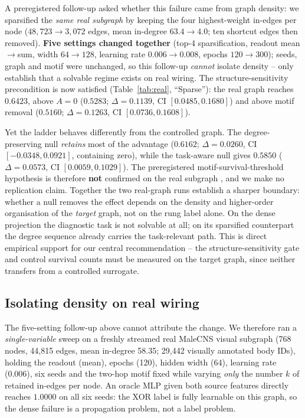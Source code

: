 \documentclass[10pt,twocolumn,letterpaper]{article}
\begin{document}
A preregistered follow-up asked whether this failure came from graph density:
we sparsified the \emph{same real subgraph} by keeping the four
highest-weight in-edges per node ($48{,}723 \to 3{,}072$ edges, mean in-degree
$63.4 \to 4.0$; ten shortcut edges then removed). \textbf{Five settings
changed together} (top-4 sparsification, readout mean$\to$sum, width
$64\!\to\!128$, learning rate $0.006\!\to\!0.008$, epochs $120\!\to\!300$);
seeds, graph and motif were unchanged, so this follow-up \emph{cannot} isolate
density -- only establish that a solvable regime exists on real wiring. The
structure-sensitivity precondition is now satisfied (Table~\ref{tab:real},
``Sparse''): the real graph reaches $0.6423$, above $A\!=\!0$ ($0.5283$;
$\Delta=0.1139$, CI $[0.0485,0.1680]$) and above motif removal ($0.5160$;
$\Delta=0.1263$, CI $[0.0736,0.1608]$).

Yet the ladder behaves differently from the controlled graph. The
degree-preserving null \emph{retains} most of the advantage ($0.6162$;
$\Delta=0.0260$, CI $[-0.0348,0.0921]$, containing zero), while the
task-aware null gives $0.5850$ ($\Delta=0.0573$, CI
$[0.0059,0.1029]$). The preregistered motif-survival-threshold hypothesis is
therefore \textbf{not} confirmed on the real subgraph
, and we make no replication claim.
Together the two real-graph runs establish a sharper boundary: whether a null
removes the effect depends on the density and higher-order organisation of the
\emph{target} graph, not on the rung label alone. On the dense projection the
diagnostic task is not solvable at all; on its sparsified counterpart the
degree sequence already carries the task-relevant path. This is direct
empirical support for our central recommendation -- the structure-sensitivity
gate and control survival counts must be measured on the target graph, since
neither transfers from a controlled surrogate.

\subsection{Isolating density on real wiring}
\label{sec:density}

The five-setting follow-up above cannot attribute the change. We therefore ran
a \emph{single-variable} sweep on a freshly streamed real MaleCNS visual
subgraph (768 nodes, 44{,}815 edges, mean in-degree 58.35; 29{,}442 visually
annotated body IDs), holding the readout (mean), epochs (120), hidden width
(64), learning rate (0.006), six seeds and the two-hop motif fixed while
varying \emph{only} the number $k$ of retained in-edges per node. An oracle MLP
given both source features directly reaches $1.0000$ on all six seeds: the XOR
label is fully learnable on this graph, so the dense failure is a propagation
problem, not a label problem.
\end{document}
